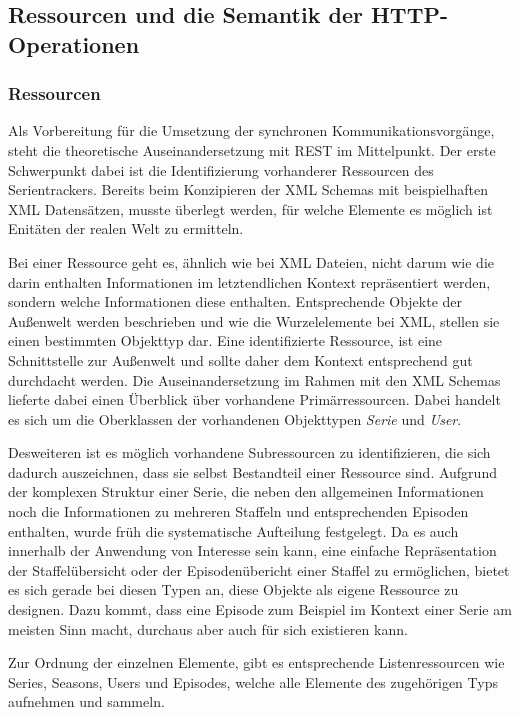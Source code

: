 \documentclass[a4paper]{article}
\begin{document}
\newpage

\subsection{Ressourcen und die Semantik der HTTP-Operationen}
\subsubsection{Ressourcen}

Als Vorbereitung für die Umsetzung der synchronen Kommunikationsvorgänge, steht die theoretische Auseinandersetzung mit REST im Mittelpunkt.
Der erste Schwerpunkt dabei ist die Identifizierung vorhanderer Ressourcen des Serientrackers. Bereits beim Konzipieren der XML Schemas mit beispielhaften XML Datensätzen, musste überlegt werden, für welche Elemente es möglich ist Enitäten der realen Welt zu ermitteln.

Bei einer Ressource geht es, ähnlich wie bei XML Dateien, nicht darum wie die darin enthalten Informationen im letztendlichen Kontext repräsentiert werden, sondern welche Informationen diese enthalten. Entsprechende Objekte der Außenwelt werden beschrieben und wie die Wurzelelemente bei XML, stellen sie einen bestimmten Objekttyp dar. Eine identifizierte Ressource, ist eine Schnittstelle zur Außenwelt und sollte daher dem Kontext entsprechend gut durchdacht werden.
Die Auseinandersetzung im Rahmen mit den XML Schemas lieferte dabei einen Überblick über vorhandene Primärressourcen. Dabei handelt es sich um die Oberklassen der vorhandenen Objekttypen \textit{Serie} und \textit{User}.

Desweiteren ist es möglich vorhandene Subressourcen zu identifizieren, die sich dadurch auszeichnen, dass sie selbst Bestandteil einer Ressource sind.
Aufgrund der komplexen Struktur einer Serie, die neben den allgemeinen Informationen noch die Informationen zu mehreren Staffeln und entsprechenden Episoden enthalten, wurde früh die systematische Aufteilung festgelegt.
Da es auch innerhalb der Anwendung von Interesse sein kann, eine einfache Repräsentation der Staffelübersicht oder der Episodenübericht einer Staffel zu ermöglichen, bietet es sich gerade bei diesen Typen an, diese Objekte als eigene Ressource zu designen. Dazu kommt, dass eine Episode zum Beispiel im Kontext einer Serie am meisten Sinn macht, durchaus aber auch für sich existieren kann.

Zur Ordnung der einzelnen Elemente, gibt es entsprechende Listenressourcen wie Series, Seasons, Users und Episodes, welche alle Elemente des zugehörigen Typs aufnehmen und sammeln.
\end{document}
